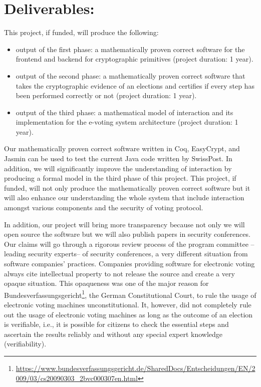 \documentclass[a4paper]{article}
\begin{document}
  
\section{Deliverables:} 

This project, if funded, will produce the following:
\begin{itemize}
  \item output of the first phase: a mathematically proven correct software for the frontend and backend 
    for cryptographic primitives (project duration: 1 year). 
  \item output of the second phase: a mathematically proven correct software that takes the cryptographic evidence of an elections
    and certifies if every step has been performed correctly or not (project duration: 1 year). 
  \item output of the third phase: a mathematical model of interaction and its implementation 
    for the e-voting system architecture (project duration: 1 year).
  
\end{itemize}

Our mathematically proven correct software written in Coq, EasyCrypt, and Jasmin 
can be used to test the current Java code written by SwissPost. In addition, we 
will significantly improve the understanding of interaction by producing a formal model 
in the third phase of this project. This project, if funded, will 
not only produce the mathematically proven correct software but it will also 
enhance our understanding the whole system that include interaction amongst 
various components and the security of voting protocol. 

In addition, our project will bring more transparency because not only we will 
open source the software but we will also publish papers in security conferences. 
Our claims will go through a rigorous review process of the program committee --leading 
security experts-- of security conferences, 
a very different situation from software companies' practices. Companies providing software for 
electronic voting always cite intellectual property to not release the 
source and create a very opaque situation. This opaqueness was one of the major reason for
Bundesverfassungsgericht\footnote{\url{https://www.bundesverfassungsgericht.de/SharedDocs/Entscheidungen/EN/2009/03/cs20090303_2bvc000307en.html}}, 
the German Constitutional Court, to rule the usage of electronic voting
machines unconstitutional. It, however, did not completely rule out the usage of electronic voting
machines as long as the outcome of an election is verifiable, i.e., it is possible for citizens to check
the essential steps and ascertain the results reliably and without
any special expert knowledge (verifiability).





\end{document}
